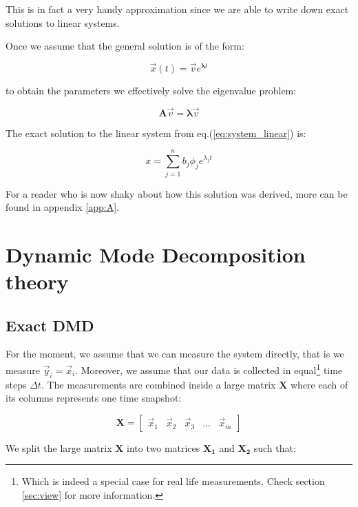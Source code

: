 \documentclass[10pt,twocolumn]{article}
\begin{document}
This is in fact a very handy approximation since we are able to write down exact solutions to linear systems.

Once we assume that the general solution is of the form:

\begin{equation} \label{eq:general_solution}
\vec{x}(t) = \vec{v} e^{\bm{\lambda} t}
\end{equation}

to obtain the parameters we effectively solve the eigenvalue problem:

\begin{equation} \label{eq:eigenvalue_solution}
\bm{A} \vec{v} = \bm{\lambda} \vec{v}
\end{equation}

The exact solution to the linear system from eq.(\ref{eq:system_linear}) is:

\begin{equation} \label{eq:soln_exact}
x = \sum_{j = 1}^{n} b_j \phi_j e^{\lambda_j t}
\end{equation}

For a reader who is now shaky about how this solution was derived, more can be found in appendix \ref{app:A}. 

\section{Dynamic Mode Decomposition theory}

\subsection{Exact DMD}

For the moment, we assume that we can measure the system directly, that is we measure $\vec{y}_i = \vec{x}_i$. Moreover, we assume that our data is collected in equal\footnote{Which is indeed a special case for real life measurements. Check section \ref{sec:view} for more information.} time steps $\Delta t$. The measurements are combined inside a large matrix $\bm{X}$ where each of its columns represents one time snapshot:

\begin{equation} \label{eq:X}
\bm{X} = 
\begin{bmatrix}
    \vec{x}_1 & \vec{x}_2 & \vec{x}_3 & \dots & \vec{x}_{m}
\end{bmatrix}
\end{equation}

We split the large matrix $\bm{X}$ into two matrices $\bm{X_1}$ and $\bm{X_2}$ such that:
\end{document}
